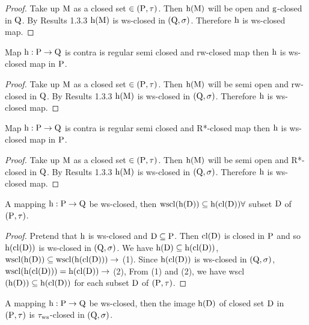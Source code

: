 \begin{proof}
Take up $\mathrm{M}$ as a closed set $\in (\mathrm{P}, \tau)$. Then $\mathrm{h} (\mathrm{M})$ will be open and $\mathrm{g}$-closed in $\mathrm{Q}$. By Results 1.3.3 $\mathrm{h} (\mathrm{M})$ is ws-closed in $(\mathrm{Q}, \sigma)$. Therefore $\mathrm{h}$ is ws-closed map.
\end{proof}

\begin{thm}\label{thm4.2.26}
Map $\mathrm{h}: \mathrm{P} \to \mathrm{Q}$ is contra is regular semi closed and rw-closed map then $\mathrm{h}$ is ws-closed map in $\mathrm{P}$.
\end{thm}

\begin{proof}
Take up $\mathrm{M}$ as a closed set $\in(\mathrm{P}, \tau)$. Then $\mathrm{h} (\mathrm{M})$ will be semi open and rw-closed in $\mathrm{Q}$. By Results 1.3.3 $\mathrm{h} (\mathrm{M})$ is ws-closed in $(\mathrm{Q}, \sigma)$. Therefore $\mathrm{h}$ is ws-closed map.
\end{proof}

\begin{thm}\label{thm4.2.27}
Map $\mathrm{h}: \mathrm{P} \to \mathrm{Q}$ is contra is regular semi closed and R*-closed map then $\mathrm{h}$ is ws-closed map in $\mathrm{P}$.
\end{thm}

\begin{proof}
Take up $\mathrm{M}$ as a closed set $\in (\mathrm{P}, \tau)$. Then $\mathrm{h} (\mathrm{M})$ will be semi open and R*-closed in $\mathrm{Q}$. By Results 1.3.3 $\mathrm{h} (\mathrm{M})$ is ws-closed in $(\mathrm{Q}, \sigma)$. Therefore $\mathrm{h}$ is ws-closed map.
\end{proof}

\begin{thm}\label{thm4.2.28}
A mapping $\mathrm{h}: \mathrm{P} \to \mathrm{Q}$ be ws-closed, then $\mathrm{wscl} (\mathrm{h}(\mathrm{D}))\subseteq \mathrm{h}(\mathrm{cl} (\mathrm{D})) \forall$ subset $\mathrm{D}$ of $(\mathrm{P}, \tau)$.
\end{thm}

\begin{proof}
Pretend that $\mathrm{h}$ is ws-closed and $\mathrm{D} \subseteq \mathrm{P}$. Then $\mathrm{cl}(\mathrm{D})$ is closed in $\mathrm{P}$ and so $\mathrm{h}(\mathrm{cl}(\mathrm{D}))$ is ws-closed in $(\mathrm{Q}, \sigma)$. We have $\mathrm{h}(\mathrm{D}) \subseteq \mathrm{h}(\mathrm{cl}(\mathrm{D}))$, $\wscl(\TSh(\clrD)) \subseteq \wscl(\TSh(\cl(\clrD)))\break \to$ (1). Since $\mathrm{h}(\mathrm{cl}(\mathrm{D}))$ is ws-closed in $(\mathrm{Q}, \sigma)$, $\mathrm{wscl}(\mathrm{h}(\mathrm{cl}(\mathrm{D}))) = \mathrm{h} (\mathrm{cl} (\mathrm{D})) \to$ (2), From (1) and (2), we have wscl $(\mathrm{h}(\mathrm{D})) \subseteq \mathrm{h}(\mathrm{cl}(\mathrm{D}))$ for each subset $\mathrm{D}$ of $(\mathrm{P}, \tau)$.
\end{proof}

\begin{coro}\label{coro4.2.29}
A mapping $\mathrm{h}: \mathrm{P} \to \mathrm{Q}$ be ws-closed, then the image $\mathrm{h}(\mathrm{D})$ of closed set $\mathrm{D}$ in $(\mathrm{P}, \tau)$ is $\tau_{\mathrm{ws}}$-closed in $(\mathrm{Q}, \sigma)$.
\end{coro}

